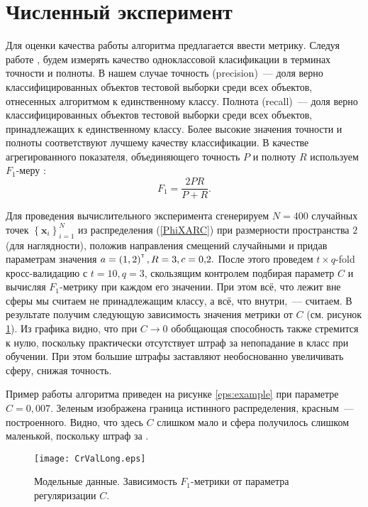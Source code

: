 ﻿\documentclass[12pt,a4paper]{amsart}
\newcommand\mb[1]{\ensuremath{\boldsymbol{\mathbf{#1}}}}
\newcommand\cbr[1]{\left(#1\right)} %
\newcommand\fbr[1]{\left\{#1\right\}} %
\newcommand{\T}{^{\text{\tiny\sffamily\upshape\mdseries T}}}
\begin{document}
\section{Численный эксперимент} 		 	
	Для оценки качества работы алгоритма предлагается ввести метрику. 
	Следуя работе  \cite{Romanenko2012}, будем измерять качество одноклассовой класификации в терминах точности и полноты. 
	В нашем случае точность (precision)~--- доля верно классифицированных объектов тестовой выборки среди всех объектов, отнесенных алгоритмом к единственному классу. 
	Полнота (recall)~--- доля верно классифицированных объектов тестовой выборки среди всех объектов, принадлежащих к единственному классу. 
	Более высокие значения точности и полноты соответствуют лучшему качеству классификации. 
	В качестве агрегированного показателя, объединяющего точность $P$ и полноту $R$ используем $F_1$-меру \cite{Rijsbergen1979}:
	$$F_1 = \frac{2PR}{P+R}.$$

	Для проведения вычислительного эксперимента сгенерируем $N=400$ случайных точек $\fbr{\mb x_i}_{i=1}^N$ из распределения (\ref{PhiXARC}) при размерности пространства $2$ (для наглядности), положив направления смещений случайными и придав параметрам значения $a = \cbr{1,2}\T, R = 3, c = 0{,}2.$
	После этого проведем $t{\times}q$-fold кросс-валидацию с $t = 10, q = 3$, скользящим контролем подбирая параметр $C$ и вычисляя $F_1$-метрику при каждом его значении. При этом всё, что лежит вне сферы мы считаем не принадлежащим классу, а всё, что внутри,~--- считаем.
	В результате получим следующую зависимость значения метрики от $C$ (см. рисунок \ref{eps:CrValLong}).
	Из графика видно, что при $C\to 0$ обобщающая способность также стремится к нулю, поскольку практически отсутствует штраф за непопадание в класс при обучении. 
	При этом большие штрафы заставляют необоснованно увеличивать сферу, снижая точность.

	Пример работы алгоритма приведен на рисунке \ref{eps:example} при параметре $C = 0{,}007.$ 
	Зеленым изображена граница истинного распределения, красным~--- построенного.
	Видно, что здесь $C$ слишком мало и сфера получилось слишком маленькой, поскольку штраф за .
	
	\begin{figure}[!ht] %
		\centering
		\texttt{[image: CrValLong.eps]} %
		\vspace{-5pt}
		\caption{Модельные данные. Зависимость $F_1$-метрики от параметра регуляризации $C$.}
		\label{eps:CrValLong}
	\end{figure}
\end{document}

